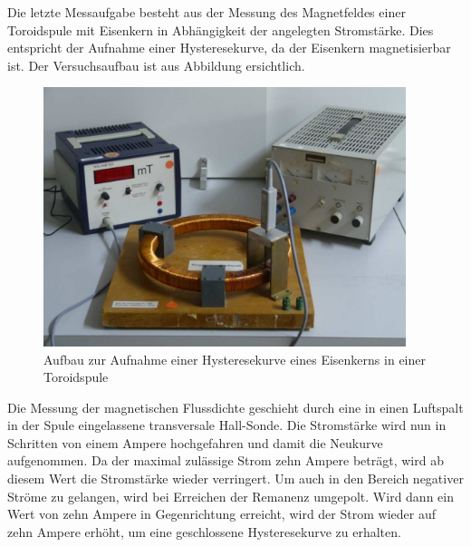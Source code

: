 Die letzte Messaufgabe besteht aus der Messung des Magnetfeldes einer Toroidspule mit Eisenkern
in Abhängigkeit der angelegten Stromstärke. Dies entspricht der Aufnahme einer
Hysteresekurve, da der Eisenkern magnetisierbar ist. Der Versuchsaufbau ist aus
Abbildung \label{fig:aufbau_toroid} ersichtlich.
\begin{figure}
  \centering
  \includegraphics[width=300pt]{data/aufbau3.png}
  \caption{Aufbau zur Aufnahme einer Hysteresekurve eines Eisenkerns in einer Toroidspule \cite{Versuchsanleitung}}
  \label{fig:Aufbau_helmholtz}
\end{figure}
Die Messung der magnetischen Flussdichte geschieht durch eine in einen Luftspalt in der Spule
eingelassene transversale Hall-Sonde.
Die Stromstärke wird nun in Schritten von einem Ampere hochgefahren und damit die Neukurve
aufgenommen. Da der maximal zulässige Strom zehn Ampere beträgt, wird ab diesem Wert
die Stromstärke wieder verringert. Um auch in den Bereich negativer Ströme zu gelangen,
wird bei Erreichen der Remanenz umgepolt. Wird dann ein Wert von zehn Ampere in Gegenrichtung
erreicht, wird der Strom wieder auf zehn Ampere erhöht, um eine geschlossene
Hysteresekurve zu erhalten.
